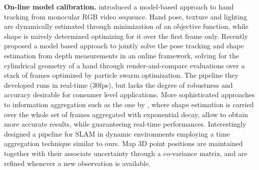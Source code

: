 \textbf{On-line model calibration.}
\cite{delagorce2011model} introduced a model-based approach to hand tracking from monocular RGB video sequence. Hand pose, texture and lighting are dynamically estimated through minimization of an objective function, while shape is naively determined optimizing for it over the first frame only. 
Recently \cite{makris2015model} proposed a model based approach to jointly solve the pose tracking and shape estimation from depth measurements in an online framework, solving for the cylindrical geometry of a hand through render-and-compare evaluations over a stack of frames optimized by particle swarm optimization. The pipeline they developed runs in real-time (30fps), but lacks the degree of robustness and accuracy desirable for consumer level applications.
More sophisticated approaches to information aggregation such as the one by \cite{bouaziz2013online}, where shape estimation is carried over the whole set of frames aggregated with exponential decay, allow to obtain more accurate results, while guaranteeing real-time performances. Interestingly \cite{zou2013coslam} designed a pipeline for SLAM in dynamic environments employing a time aggregation technique similar to ours. Map 3D point positions are maintained together with their associate uncertainty through a co-variance matrix, and are refined whenever a new observation is available.
